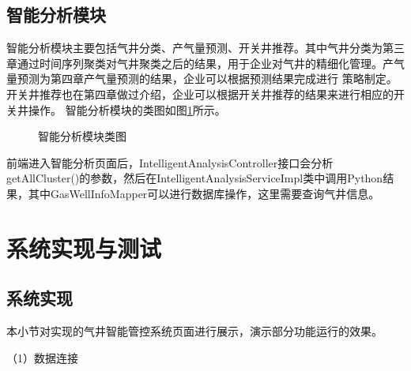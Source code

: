 \subsection{智能分析模块}
智能分析模块主要包括气井分类、产气量预测、开关井推荐。其中气井分类为第三章通过时间序列聚类对气井聚类之后的结果，用于企业对气井的精细化管理。产气量预测为第四章产气量预测的结果，企业可以根据预测结果完成进行
策略制定。开关井推荐也在第四章做过介绍，企业可以根据开关井推荐的结果来进行相应的开关井操作。
智能分析模块的类图如图\ref{fig:analyclass}所示。
\begin{figure}[H]
    \centering
    \caption{智能分析模块类图}
    \label{fig:analyclass}
\end{figure}
前端进入智能分析页面后，IntelligentAnalysisController接口会分析getAllCluster()的参数，然后在IntelligentAnalysisServiceImpl类中调用Python结果，其中GasWellInfoMapper可以进行数据库操作，这里需要查询气井信息。
\section{系统实现与测试}
\subsection{系统实现}
本小节对实现的气井智能管控系统页面进行展示，演示部分功能运行的效果。

（1）数据连接



